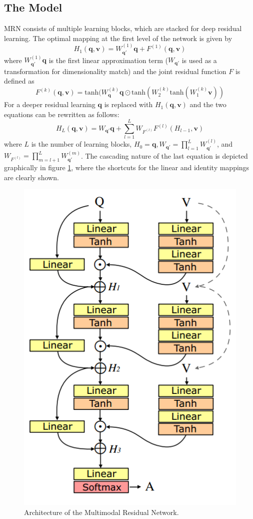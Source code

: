 \documentclass{article}
\begin{document}
\subsection{The Model}
MRN consists of multiple learning blocks, which are stacked for deep residual learning. The optimal mapping at the first level of the network is given by
\begin{equation*}
    H_1(\bm{q},\bm{v}) = W_{\bm{q'}}^{(1)}\bm{q} + F^{(1)}(\bm{q},\bm{v})
\end{equation*}
where $W_{\bm{q'}}^{(1)}\bm{q}$ is the first linear approximation term ($W_{\bm{q'}}$ is used as a transformation for dimensionality match) and the joint residual function $F$ is defined as
\begin{equation*}
    F^{(k)}(\bm{q},\bm{v}) = \text{tanh}(W_{\bm{q}}^{(k)}\bm{q}\odot\text{tanh}(W_2^{(k)}\text{tanh}(W_1^{(k)}\bm{v}))
\end{equation*}
For a deeper residual learning $\bm{q}$ is replaced with $H_1(\bm{q},\bm{v})$ and the two equations can be rewritten as follows:
\begin{equation*}
    H_L(\bm{q},\bm{v}) = W_{\bm{q'}}\bm{q} + \sum_{l=1}^LW_{F^{(l)}}F^{(l)}(H_{l-1},\bm{v})
\end{equation*}
where $L$ is the number of learning blocks, $H_0 = \bm{q}, W_{\bm{q'}}=\prod_{l=1}^LW_{\bm{q'}}^{(l)}$, and $W_{F^{(l)}} = \prod_{m=l+1}^LW_{\bm{q'}}^{(m)}$. The cascading nature of the last equation is depicted graphically in figure \ref{mrnModel}, where the shortcuts for the linear and identity mappings are clearly shown.

    \begin{figure}[ht]
    	\centering
            \includegraphics[width=0.35\linewidth]{mrnModel.PNG}
    	\caption{Architecture of the Multimodal Residual Network.}
    	\label{mrnModel}
    \end{figure}
\end{document}
